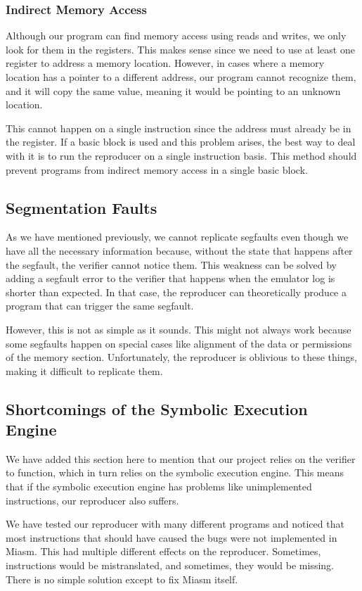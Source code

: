 \subsubsection{Indirect Memory Access}
Although our program can find memory access using reads and writes, we only look for them in the registers.
This makes sense since we need to use at least one register to address a memory location.
However, in cases where a memory location has a pointer to a different address, our program cannot recognize them, and it will copy the same value, meaning it would be pointing to an unknown location.

This cannot happen on a single instruction since the address must already be in the register.
If a basic block is used and this problem arises, the best way to deal with it is to run the reproducer on a single instruction basis.
This method should prevent programs from indirect memory access in a single basic block. 

\subsection{Segmentation Faults}
As we have mentioned previously, we cannot replicate \ac{segfault}s even though we have all the necessary information because, without the state that happens after the \ac{segfault}, the verifier cannot notice them.
This weakness can be solved by adding a \ac{segfault} error to the verifier that happens when the emulator log is shorter than expected.
In that case, the reproducer can theoretically produce a program that can trigger the same \ac{segfault}.

However, this is not as simple as it sounds.
This might not always work because some \ac{segfault}s happen on special cases like alignment of the data or permissions of the memory section.
Unfortunately, the reproducer is oblivious to these things, making it difficult to replicate them.

\subsection{Shortcomings of the Symbolic Execution Engine}
We have added this section here to mention that our project relies on the verifier to function, which in turn relies on the symbolic execution engine.
This means that if the symbolic execution engine has problems like unimplemented instructions, our reproducer also suffers.

We have tested our reproducer with many different programs and noticed that most instructions that should have caused the bugs were not implemented in Miasm.
This had multiple different effects on the reproducer.
Sometimes, instructions would be mistranslated, and sometimes, they would be missing.
There is no simple solution except to fix Miasm itself.

